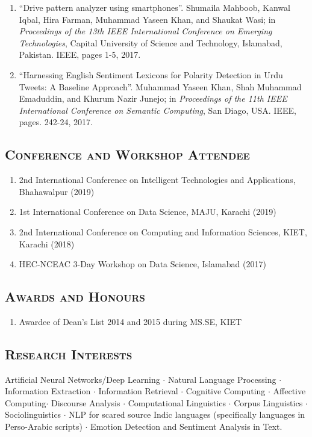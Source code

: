 \documentclass[a4paper, 10pt]{article}
\begin{document}
\begin{enumerate}
  \item ``Drive pattern analyzer using smartphones''. Shumaila Mahboob, Kanwal Iqbal, Hira Farman, Muhammad Yaseen Khan, and Shaukat Wasi; in \emph{ Proceedings of the 13th IEEE International Conference on Emerging Technologies}, Capital University of Science and Technology, Islamabad, Pakistan. IEEE, pages 1-5, 2017.
  
  \item ``Harnessing English Sentiment Lexicons for Polarity Detection in Urdu Tweets: A Baseline Approach''. Muhammad Yaseen Khan, Shah Muhammad Emaduddin, and Khurum Nazir Junejo;  in \emph{Proceedings of the 11th IEEE International Conference on Semantic Computing}, San Diago, USA. IEEE, pages. 242-24, 2017.
\end{enumerate}

\subsection*{\normalfont\textsc{\bf Conference and Workshop Attendee}}
\begin{enumerate}
\itemsep-4pt
\item 2nd International Conference on Intelligent Technologies and Applications, Bhahawalpur (2019)
\item 1st International Conference on Data Science, MAJU, Karachi (2019)
\item 2nd International Conference on Computing and Information Sciences, KIET, Karachi (2018)
\item HEC-NCEAC 3-Day Workshop on Data Science, Islamabad (2017) 
\end{enumerate}

\subsection*{\normalfont\textsc{\bf Awards and Honours}}
\begin{enumerate}
\itemsep-4pt 
 \item Awardee of Dean's List 2014 and 2015 during MS.SE, KIET
\end{enumerate}

\subsection*{\normalfont\textsc{\bf Research Interests}}
Artificial Neural Networks/Deep Learning $\cdot$ Natural Language Processing $\cdot$ Information Extraction $\cdot$ Information Retrieval $\cdot$ Cognitive Computing $\cdot$ Affective Computing$\cdot$ Discourse Analysis $\cdot$ Computational Linguistics $\cdot$  Corpus Linguistics $\cdot$ Sociolinguistics $\cdot$ NLP for scared source Indic languages (specifically languages in Perso-Arabic scripts) $\cdot$ Emotion Detection and Sentiment Analysis in Text.
\end{document}
